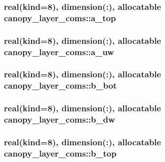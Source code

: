 \subsubsection[{a\+\_\+top}]{\setlength{\rightskip}{0pt plus 5cm}real(kind=8), dimension(\+:), allocatable canopy\+\_\+layer\+\_\+coms\+::a\+\_\+top}\label{namespacecanopy__layer__coms_acef66a2794edd028cbebb25b81c94582}
\hypertarget{namespacecanopy__layer__coms_a0aee7af32fcb60ed8f8935d4d74ea9db}{}
\subsubsection[{a\+\_\+uw}]{\setlength{\rightskip}{0pt plus 5cm}real(kind=8), dimension(\+:), allocatable canopy\+\_\+layer\+\_\+coms\+::a\+\_\+uw}\label{namespacecanopy__layer__coms_a0aee7af32fcb60ed8f8935d4d74ea9db}
\hypertarget{namespacecanopy__layer__coms_a6d1bef43490e88277ca78abdc845766c}{}
\subsubsection[{b\+\_\+bot}]{\setlength{\rightskip}{0pt plus 5cm}real(kind=8), dimension(\+:), allocatable canopy\+\_\+layer\+\_\+coms\+::b\+\_\+bot}\label{namespacecanopy__layer__coms_a6d1bef43490e88277ca78abdc845766c}
\hypertarget{namespacecanopy__layer__coms_a4a34e13a815b0c72c3ac6ab0e4cc3c42}{}
\subsubsection[{b\+\_\+dw}]{\setlength{\rightskip}{0pt plus 5cm}real(kind=8), dimension(\+:), allocatable canopy\+\_\+layer\+\_\+coms\+::b\+\_\+dw}\label{namespacecanopy__layer__coms_a4a34e13a815b0c72c3ac6ab0e4cc3c42}
\hypertarget{namespacecanopy__layer__coms_af986529a5d36d7c69ccaf9af08e38d1c}{}
\subsubsection[{b\+\_\+top}]{\setlength{\rightskip}{0pt plus 5cm}real(kind=8), dimension(\+:), allocatable canopy\+\_\+layer\+\_\+coms\+::b\+\_\+top}\label{namespacecanopy__layer__coms_af986529a5d36d7c69ccaf9af08e38d1c}
\hypertarget{namespacecanopy__layer__coms_ace887e140ffc0ef5ba218f09ce5dd6db}{}
